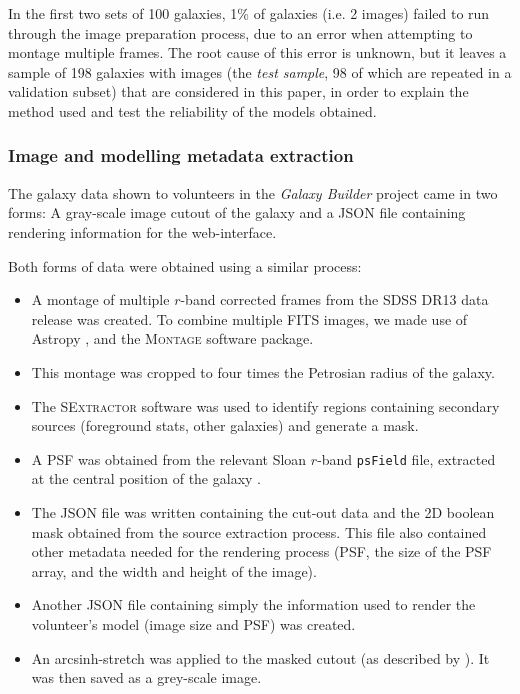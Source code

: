 \documentclass[../main.tex]{subfiles}
\begin{document}
In the first two sets of 100 galaxies, 1\% of galaxies (i.e. 2 images) failed to run through the image preparation process, due to an error when attempting to montage multiple frames. The root cause of this error is unknown, but it leaves a sample of 198 galaxies with images (the \textit{test sample}, 98 of which are repeated in a validation subset) that are considered in this paper, in order to explain the method used and test the reliability of the models obtained.

\subsubsection{Image and modelling metadata extraction}
\label{sec:image_creation}

The galaxy data shown to volunteers in the \textit{Galaxy Builder} project came in two forms: A gray-scale image cutout of the galaxy and a JSON file containing rendering information for the web-interface.

Both forms of data were obtained using a similar process:

\begin{itemize}
\item A montage of multiple $r$-band corrected frames from the SDSS DR13 \citep{2017ApJS..233...25A} data release was created. To combine multiple FITS images, we made use of Astropy \citep{2018AJ....156..123A}, and the \textsc{Montage} \citep{2010arXiv1005.4454J} software package.
\item This montage was cropped to four times the Petrosian radius of the galaxy.
\item The \textsc{SExtractor} software \citep{source-extractor} was used to identify regions containing secondary sources (foreground stats, other galaxies) and generate a mask.
\item A PSF was obtained from the relevant Sloan $r$-band \texttt{psField} file, extracted at the central position of the galaxy \citep{2002AJ....123..485S}.
\item The JSON file was written containing the cut-out data and the 2D boolean mask obtained from the source extraction process. This file also contained other metadata needed for the rendering process (PSF, the size of the PSF array, and the width and height of the image).
\item Another JSON file containing simply the information used to render the volunteer's model (image size and PSF) was created.
\item An arcsinh-stretch was applied to the masked cutout (as described by \citealt{Lupton2003:astro-ph/0312483v1}). It was then saved as a grey-scale image.
\end{itemize}
\end{document}
